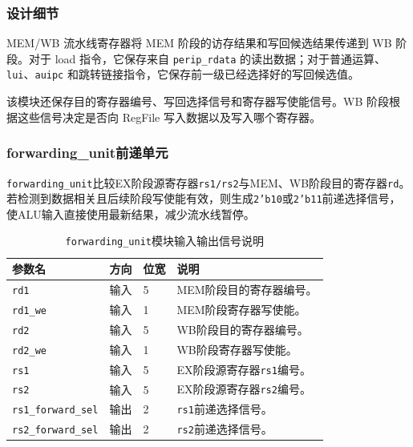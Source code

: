 \documentclass[12pt,a4paper]{ctexart}
\newcommand{\code}[1]{\texttt{#1}}
\begin{document}
\subsubsection*{设计细节}

MEM/WB 流水线寄存器将 MEM 阶段的访存结果和写回候选结果传递到 WB 阶段。对于 load 指令，它保存来自 \code{perip\_rdata} 的读出数据；对于普通运算、\code{lui}、\code{auipc} 和跳转链接指令，它保存前一级已经选择好的写回候选值。

该模块还保存目的寄存器编号、写回选择信号和寄存器写使能信号。WB 阶段根据这些信号决定是否向 RegFile 写入数据以及写入哪个寄存器。

\subsubsection{forwarding\_unit前递单元}

\code{forwarding\_unit}比较EX阶段源寄存器\code{rs1/rs2}与MEM、WB阶段目的寄存器\code{rd}。若检测到数据相关且后续阶段写使能有效，则生成\code{2'b10}或\code{2'b11}前递选择信号，使ALU输入直接使用最新结果，减少流水线暂停。

\begin{table}[H]
	\centering
	\caption{\code{forwarding\_unit}模块输入输出信号说明}
	\footnotesize
	\renewcommand{\arraystretch}{1.15}
	\begin{tabularx}{\textwidth}{p{3.2cm}p{1.5cm}p{2.1cm}X}
		\toprule
		参数名                      & 方向 & 位宽 & 说明                    \\
		\midrule
		\code{rd1}               & 输入 & 5  & MEM阶段目的寄存器编号。         \\
		\code{rd1\_we}           & 输入 & 1  & MEM阶段寄存器写使能。          \\
		\code{rd2}               & 输入 & 5  & WB阶段目的寄存器编号。          \\
		\code{rd2\_we}           & 输入 & 1  & WB阶段寄存器写使能。           \\
		\code{rs1}               & 输入 & 5  & EX阶段源寄存器\code{rs1}编号。 \\
		\code{rs2}               & 输入 & 5  & EX阶段源寄存器\code{rs2}编号。 \\
		\code{rs1\_forward\_sel} & 输出 & 2  & \code{rs1}前递选择信号。     \\
		\code{rs2\_forward\_sel} & 输出 & 2  & \code{rs2}前递选择信号。     \\
		\bottomrule
	\end{tabularx}
\end{table}
\end{document}
